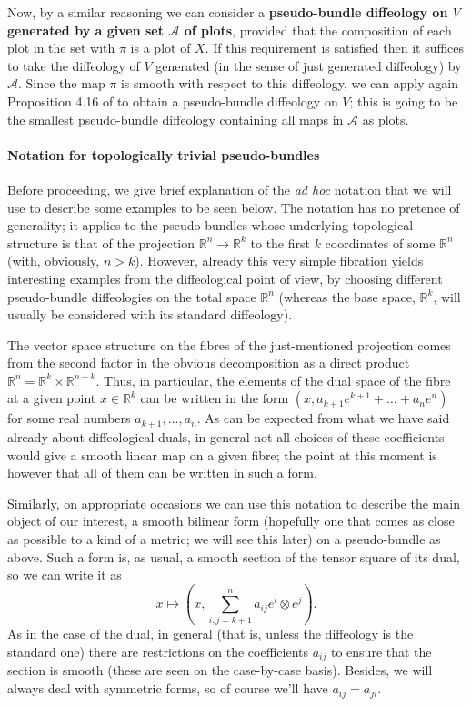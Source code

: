 \documentclass{article}
\newcommand\matR{{\mathbb{R}}}
\begin{document}
Now, by a similar reasoning we can consider a \textbf{pseudo-bundle diffeology on $V$ generated by a given set $\mathcal{A}$ of plots}, provided that the composition of each plot in the set with $\pi$ is
a plot of $X$. If this requirement is satisfied then it suffices to take the diffeology of $V$ generated (in the sense of just generated diffeology) by $\mathcal{A}$. Since the map $\pi$ is smooth with respect to 
this diffeology, we can apply again Proposition 4.16 of \cite{CWtangent} to obtain a pseudo-bundle diffeology on $V$; this is going to be the smallest pseudo-bundle diffeology containing all maps in 
$\mathcal{A}$ as plots.

\paragraph{Notation for topologically trivial pseudo-bundles} Before proceeding, we give brief explanation of the \emph{ad hoc} notation that we will use to describe some examples to be seen below. The
notation has no pretence of generality; it applies to the pseudo-bundles whose underlying topological structure is that of the projection $\matR^n\to\matR^k$ to the first $k$ coordinates of some $\matR^n$ 
(with, obviously, $n>k$). However, already this very simple fibration yields interesting examples from the diffeological point of view, by choosing different pseudo-bundle diffeologies on the total space 
$\matR^n$ (whereas the base space, $\matR^k$, will usually be considered with its standard diffeology).

The vector space structure on the fibres of the just-mentioned projection comes from the second factor in the obvious decomposition as a direct product $\matR^n=\matR^k\times\matR^{n-k}$. Thus, in
particular, the elements of the dual space of the fibre at a given point $x\in\matR^k$ can be written in the form $(x,a_{k+1}e^{k+1}+\ldots+a_ne^n)$ for some real numbers $a_{k+1},\ldots,a_n$. As can 
be expected from what we have said already about diffeological duals, in general not all choices of these coefficients would give a smooth linear map on a given fibre; the point at this moment is however 
that all of them can be written in such a form.

Similarly, on appropriate occasions we can use this notation to describe the main object of our interest, a smooth bilinear form (hopefully one that comes as close as possible to a kind of a metric; we will see 
this later) on a pseudo-bundle as above. Such a form is, as usual, a smooth section of the tensor square of its dual, so we can write it as
$$x\mapsto(x,\sum_{i,j=k+1}^n a_{ij}e^i\otimes e^j).$$ As in the case of the dual, in general (that is, unless the diffeology is the standard one) there are restrictions on the coefficients $a_{ij}$ to ensure that 
the section is smooth (these are seen on the case-by-case basis). Besides, we will always deal with symmetric forms, so of course we'll have $a_{ij}=a_{ji}$.
\end{document}

